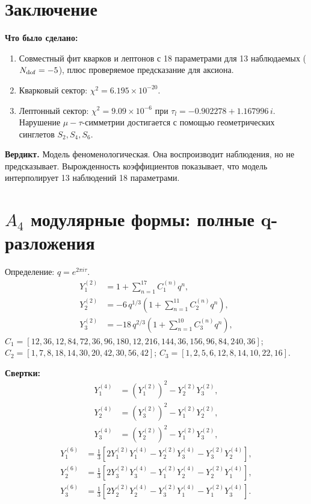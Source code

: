 \documentclass[12pt,a4paper]{article}
\numberwithin{equation}{section}
\begin{document}
\section{Заключение}
\textbf{Что было сделано:}
\begin{enumerate}[leftmargin=1.5em]
\item Совместный фит кварков и лептонов с 18 параметрами для 13 наблюдаемых ($N_{\rm dof} = -5$), плюс проверяемое предсказание для аксиона.
\item Кварковый сектор: $\chi^2 = 6.195\times10^{-20}$.
\item Лептонный сектор: $\chi^2 = 9.09\times10^{-6}$ при \(\tau_l = -0.902278 + 1.167996\,i\). Нарушение \(\mu-\tau\)-симметрии достигается с помощью геометрических синглетов \(S_2, S_4, S_6\).
\end{enumerate}

\textbf{Вердикт.} Модель феноменологическая. Она воспроизводит наблюдения, но не предсказывает. Вырожденность коэффициентов показывает, что модель интерполирует 13 наблюдений 18 параметрами.

\appendix
\newpage

\section{$A_4$ модулярные формы: полные q-разложения}
Определение: $q = e^{2\pi i\tau}$.
\begin{align}
Y_1^{(2)} &= 1 + \sum_{n=1}^{17} C_1^{(n)} q^n, \\
Y_2^{(2)} &= -6\, q^{1/3}\left(1 + \sum_{n=1}^{11} C_2^{(n)} q^n\right), \\
Y_3^{(2)} &= -18\, q^{2/3}\left(1 + \sum_{n=1}^{10} C_3^{(n)} q^n\right),
\end{align}
$C_1 = [12, 36, 12, 84, 72, 36, 96, 180, 12, 216, 144, 36, 156, 96, 84, 240, 36]$;
$C_2 = [1, 7, 8, 18, 14, 30, 20, 42, 30, 56, 42]$;
$C_3 = [1, 2, 5, 6, 12, 8, 14, 10, 22, 16]$.

\textbf{Свертки:}
\begin{align}
Y_1^{(4)} &= (Y_1^{(2)})^2 - Y_2^{(2)} Y_3^{(2)}, \\
Y_2^{(4)} &= (Y_3^{(2)})^2 - Y_1^{(2)} Y_2^{(2)}, \\
Y_3^{(4)} &= (Y_2^{(2)})^2 - Y_1^{(2)} Y_3^{(2)},
\end{align}
\begin{align}
Y_1^{(6)} &= \tfrac13\left[2 Y_1^{(2)} Y_1^{(4)} - Y_2^{(2)} Y_3^{(4)} - Y_3^{(2)} Y_2^{(4)}\right], \\
Y_2^{(6)} &= \tfrac13\left[2 Y_3^{(2)} Y_3^{(4)} - Y_1^{(2)} Y_2^{(4)} - Y_2^{(2)} Y_1^{(4)}\right], \\
Y_3^{(6)} &= \tfrac13\left[2 Y_2^{(2)} Y_2^{(4)} - Y_3^{(2)} Y_1^{(4)} - Y_1^{(2)} Y_3^{(4)}\right].
\end{align}
\end{document}
